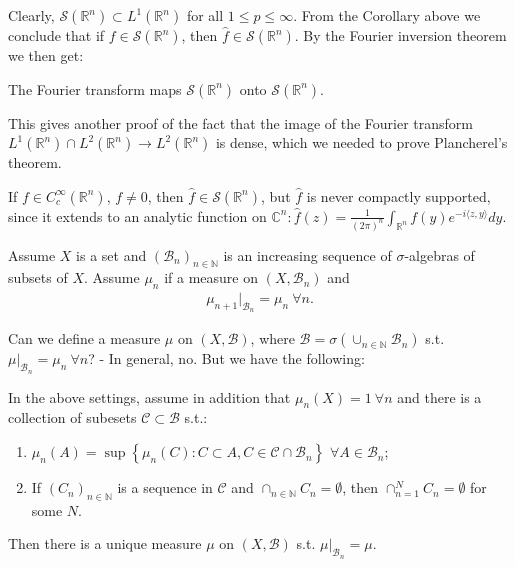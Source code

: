 Clearly, \(\mathcal{S}(\mathbb{R}^n)\subset L^{1}(\mathbb{R}^n)\) for all \(1\leq p\leq\infty\). From the Corollary above we conclude that if \(f\in\mathcal{S}(\mathbb{R}^n)\), then \(\hat{f}\in\mathcal{S}(\mathbb{R}^n)\). By the Fourier inversion theorem we then get:
\begin{theorem}
    The Fourier transform maps \(\mathcal{S}(\mathbb{R}^n)\) onto \(\mathcal{S}(\mathbb{R}^n)\).
\end{theorem}
\begin{remark}
    This gives another proof of the fact that the image of the Fourier transform \(L^1(\mathbb{R}^n)\cap L^2(\mathbb{R}^n)\rightarrow L^2(\mathbb{R}^n)\) is dense, which we needed to prove Plancherel's theorem.
\end{remark}
\begin{remark}
    If \(f\in C^{\infty}_{c}(\mathbb{R}^n)\), \(f\neq 0\), then \(\hat{f}\in\mathcal{S}(\mathbb{R}^n)\), but \(\hat{f}\) is never compactly supported, since it extends to an analytic function on \(\mathbb{C}^n: \hat{f}(z)=\frac{1}{(2\pi)^n}\int_{\mathbb{R}^n}f(y)e^{-i\langle z,y\rangle}dy\).
\end{remark}
\begin{theorem}
    Assume \(X\) is a set and \((\mathcal{B}_n)_{n\in\mathbb{N}}\) is an increasing sequence of \(\sigma\)-algebras of subsets of \(X\). Assume \(\mu_n\) if a measure on \((X,\mathcal{B}_n)\) and 
    \begin{align*}
        \mu_{n+1} \vert_{\mathcal{B}_n} = \mu_n \ \forall n.
    \end{align*}
\end{theorem}
Can we define a measure \(\mu\) on \((X,\mathcal{B})\), where \(\mathcal{B}=\sigma\left(\cup_{n\in\mathbb{N}}\mathcal{B}_n\right)\) s.t. \(\mu\vert_{\mathcal{B}_n}=\mu_n \ \forall n\)? - In general, no. But we have the following:
\begin{theorem}
    In the above settings, assume in addition that \(\mu_n(X)=1\ \forall n\) and there is a collection of subesets \(\mathcal{C}\subset\mathcal{B}\) s.t.:
    \begin{enumerate}[label=(\roman*)]
        \item \(\mu_n(A)=\sup\left\{ \mu_n(C): C\subset A, C\in\mathcal{C}\cap \mathcal{B}_n \right\}\) \(\forall A\in\mathcal{B}_n\);
        \item If \((C_n)_{n\in\mathbb{N}}\) is a sequence in \(\mathcal{C}\) and \(\cap_{n\in\mathbb{N}}C_n=\emptyset\), then \(\cap_{n=1}^{N}C_n=\emptyset\) for some \(N\). 
    \end{enumerate}
    Then there is a unique measure \(\mu\) on \((X,\mathcal{B})\) s.t. \(\mu\vert_{\mathcal{B}_n} = \mu\).
\end{theorem}